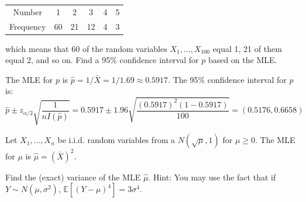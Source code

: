 \documentclass{article}
\newcommand{\E}{\mathbb{E}}
\begin{document}
\begin{probset}
\begin{prob}
\begin{subprobset}
\begin{subprob}
        \begin{center}
            \begin{tabular}{cccccc}
                \hline
                Number & 1 & 2 & 3 & 4 & 5 \\
                Frequency & 60 & 21 & 12 & 4 & 3 \\
                \hline
            \end{tabular}
        \end{center}

        which means that 60 of the random variables $X_1, \dots , X_{100}$ equal 1, 21 of them equal 2, and so on. Find a 95\% confidence interval for $p$ based on the MLE.

        \begin{soln}
            The MLE for $p$ is $\hat{p} = 1/\bar{X} = 1/1.69 \approx 0.5917$. The 95\% confidence interval for $p$ is:
            \[
                \hat{p} \pm z_{\alpha/2} \sqrt{\frac{1}{nI(\hat{p})}} = 0.5917 \pm 1.96 \sqrt{\frac{(0.5917)^2(1 - 0.5917)}{100}} = (0.5176, 0.6658)
            \]
        \end{soln}
    \end{subprob}
    \end{subprobset}
\end{prob}

\newpage

\begin{prob}
    Let $X_1, \dots , X_n$ be i.i.d. random variables from a $N (\sqrt{\mu}, 1)$ for $\mu \geq 0$. The MLE for $\mu$ is $\hat\mu = (\bar{X})^2$.

    \begin{subprobset}
    \begin{subprob}
        Find the (exact) variance of the MLE $\hat\mu$. Hint: You may use the fact that if $Y \sim N (\mu, \sigma^2)$, $\E[(Y - \mu)^4] = 3\sigma^4$.


\end{subprob}
\end{subprobset}
\end{prob}
\end{probset}
\end{document}
